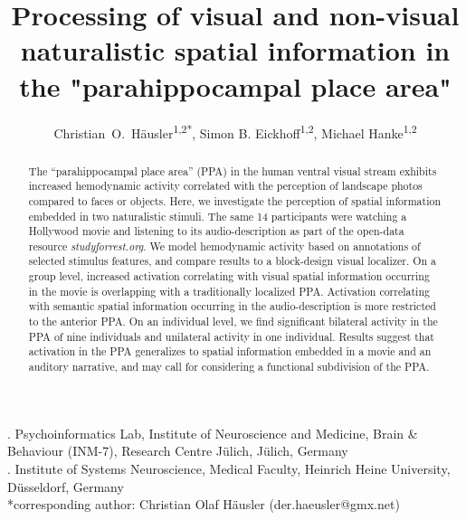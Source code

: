 \documentclass[english,11pt]{article}
\begin{document}




\title{Processing of visual and non-visual naturalistic spatial information in
  the "parahippocampal place area"}

\author{
    Christian~O.~Häusler\textsuperscript{1,2{*}},
    Simon B. Eickhoff\textsuperscript{1,2},
    Michael Hanke\textsuperscript{1,2}}

\maketitle
\thispagestyle{fancy}

. Psychoinformatics Lab, Institute of Neuroscience and Medicine, Brain \&
Behaviour (INM-7), Research Centre Jülich, Jülich, Germany\\
. Institute of Systems Neuroscience, Medical Faculty, Heinrich Heine University,
Düsseldorf, Germany\\
{*}corresponding author: Christian Olaf Häusler (der.haeusler@gmx.net)


\begin{abstract}
The ``parahippocampal place area'' (PPA) in the human ventral visual stream
exhibits increased hemodynamic activity correlated with the perception of
landscape photos compared to faces or objects.
Here, we investigate the perception of spatial information embedded in two
naturalistic stimuli.
%
The same 14 participants were watching a Hollywood movie and listening to its audio-description as part of the open-data resource \textit{studyforrest.org}.
We model hemodynamic activity based on annotations of selected stimulus
features,
and compare results to a block-design visual localizer.
On a group level, increased activation correlating with visual spatial information
occurring in the movie is overlapping with a traditionally localized PPA.
Activation correlating with semantic spatial information occurring in the
audio-description is more restricted to the anterior PPA.
On an individual level, we find significant bilateral activity in the PPA
of nine individuals and unilateral activity in one individual.
Results suggest that activation in the PPA generalizes to spatial information
embedded in a movie and an auditory narrative, and may
call for considering a functional subdivision of the PPA.  \end{abstract}
\end{document}
